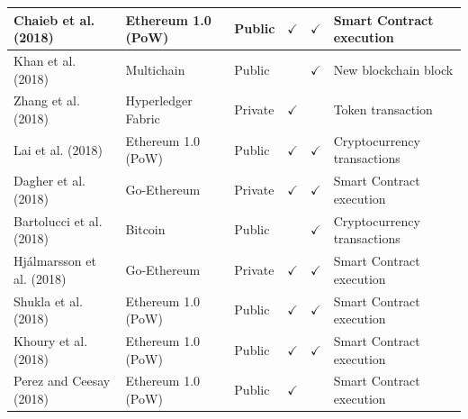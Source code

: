 \documentclass[../access.tex]{subfiles}
\begin{document}
\begin{table}[htbp]
\begin{adjustwidth}{-2cm}{}
\begin{tabular}{m{4.4cm} >{\centering\arraybackslash}m{2.9cm} >{\centering\arraybackslash}m{1.0cm} >{\centering\arraybackslash}m{1.0cm} >{\centering\arraybackslash}m{1.5cm} >{\centering\arraybackslash}m{3.6cm}}
                    \hline
                    \footnotesize{Chaieb et al. (2018) \cite{Chaieb2018}} & \footnotesize{Ethereum 1.0 (PoW)} & \footnotesize{Public} & $ \checkmark $ & $ \checkmark $ & \footnotesize{Smart Contract execution} \\
                    \hline
                    \footnotesize{Khan et al. (2018) \cite{Khan2018}} & \footnotesize{Multichain} & \footnotesize{Public} & {} & $ \checkmark $ & \footnotesize{New blockchain block} \\
                    \hline
                    \footnotesize{Zhang et al. (2018) \cite{Zhang2018}} & \footnotesize{Hyperledger Fabric} & \footnotesize{Private} & $ \checkmark $ & {} & \footnotesize{Token transaction} \\
                    \hline
                    \footnotesize{Lai et al. (2018) \cite{Lai2018}} & \footnotesize{Ethereum 1.0 (PoW)} & \footnotesize{Public} & $ \checkmark $ & $ \checkmark $ & \footnotesize{Cryptocurrency transactions} \\
                    \hline
                    \footnotesize{Dagher et al. (2018) \cite{Dagher2018}} & \footnotesize{Go-Ethereum} & \footnotesize{Private} & $ \checkmark $ & $ \checkmark $ & \footnotesize{Smart Contract execution} \\
                    \hline
                    \footnotesize{Bartolucci et al. (2018) \cite{Bartolucci2018}} & \footnotesize{Bitcoin} & \footnotesize{Public} & {} & $ \checkmark $ & \footnotesize{Cryptocurrency transactions} \\
                    \hline
                    \footnotesize{Hj\'{a}lmarsson et al. (2018) \cite{Hjalmarsson2018}} & \footnotesize{Go-Ethereum} & \footnotesize{Private} & $ \checkmark $ & $ \checkmark $ & \footnotesize{Smart Contract execution} \\
                    \hline
                    \footnotesize{Shukla et al. (2018) \cite{Shukla2018}} & \footnotesize{Ethereum 1.0 (PoW)} & \footnotesize{Public} & $ \checkmark $ & $ \checkmark $ & \footnotesize{Smart Contract execution} \\
                    \hline
                    \footnotesize{Khoury et al. (2018) \cite{Khoury2018}} & \footnotesize{Ethereum 1.0 (PoW)} & \footnotesize{Public} & $ \checkmark $ & $ \checkmark $ & \footnotesize{Smart Contract execution} \\
                    \hline
                    \footnotesize{Perez and Ceesay (2018) \cite{Perez2018}} & \footnotesize{Ethereum 1.0 (PoW)} & \footnotesize{Public} & $ \checkmark $ & {} & \footnotesize{Smart Contract execution} \\

\end{tabular}
\end{adjustwidth}
\end{table}
\end{document}
